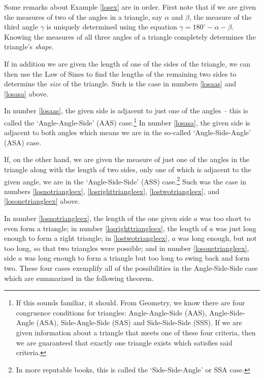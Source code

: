 \documentclass{ximera}
\begin{document}
Some remarks about Example \ref{losex} are in order. First note that if we are given the measures of two of the angles in a triangle, say $\alpha$ and $\beta$, the measure of the third angle $\gamma$ is uniquely determined using the equation  $\gamma = 180^{\circ} - \alpha - \beta$.  Knowing the measures of all three angles of a triangle completely determines the triangle's  \textit{shape}.

\smallskip

 If in addition we are given the length of one of the sides of the triangle, we can then use the Law of Sines to find the lengths of the remaining two sides to determine the \textit{size} of the triangle. Such is the case in numbers \ref{losaas} and \ref{losasa} above. 
 
 \smallskip
 
In number \ref{losaas}, the given side is adjacent to just one of the angles -- this is called the `Angle-Angle-Side' (AAS) case.\footnote{If this sounds familiar, it should.  From Geometry, we know there are four congruence conditions for triangles:  Angle-Angle-Side (AAS), Angle-Side-Angle (ASA), Side-Angle-Side (SAS) and Side-Side-Side (SSS).  If we are given information about a triangle that meets one of these four criteria, then we are guaranteed that exactly one triangle exists which satisfies said criteria.}  In number \ref{losasa}, the given side is adjacent to both angles which means we are in the so-called `Angle-Side-Angle' (ASA) case.

\smallskip

If, on the other hand, we are given the measure of just one of the angles in the triangle along with the length of two sides, only one of which is adjacent to the given angle, we are in the `Angle-Side-Side' (ASS) case.\footnote{In more reputable books, this is called the `Side-Side-Angle' or SSA case.}  Such was the case in numbers  \ref{losnotriangleex}, \ref{losrighttriangleex}, \ref{lostwotriangleex}, and  \ref{losonetriangleex} above.
 
\smallskip

In number \ref{losnotriangleex}, the length of the one given side $a$ was too short to even form a triangle;  in number \ref{losrighttriangleex}, the length of $a$ was just long enough to form a right triangle;  in \ref{lostwotriangleex}, $a$ was long enough, but not too long, so that two triangles were possible; and in number \ref{losonetriangleex}, side $a$ was long enough to form a triangle but too long to swing back and form two. These four cases exemplify all of the possibilities in the Angle-Side-Side case which are summarized in the following theorem.
\end{document}

